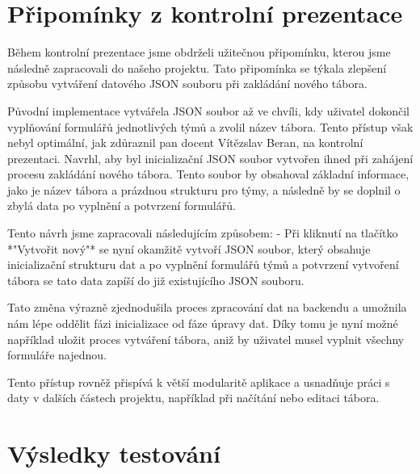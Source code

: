 \documentclass[a4paper, 12pt]{article} %
\begin{document}
\section{Připomínky z kontrolní prezentace}

Během kontrolní prezentace jsme obdrželi užitečnou připomínku, kterou jsme následně 
zapracovali do našeho projektu. Tato připomínka se týkala zlepšení způsobu vytváření datového 
JSON souboru při zakládání nového tábora. 

Původní implementace vytvářela JSON soubor až ve chvíli, kdy uživatel dokončil vyplňování 
formulářů jednotlivých týmů a zvolil název tábora. Tento přístup však nebyl optimální, jak 
zdůraznil pan docent Vítězslav Beran, na kontrolní prezentaci. Navrhl, aby byl 
inicializační JSON soubor vytvořen ihned při zahájení procesu zakládání nového tábora. 
Tento soubor by obsahoval základní informace, jako je název tábora a prázdnou strukturu 
pro týmy, a následně by se doplnil o zbylá data po vyplnění a potvrzení formulářů.

Tento návrh jsme zapracovali následujícím způsobem:
- Při kliknutí na tlačítko *"Vytvořit nový"* se nyní okamžitě vytvoří
JSON soubor, který obsahuje inicializační strukturu dat a po vyplnění formulářů týmů a 
potvrzení vytvoření tábora se tato data zapíší do již existujícího JSON souboru.

Tato změna výrazně zjednodušila proces zpracování dat na backendu a umožnila nám lépe oddělit fázi inicializace od fáze úpravy dat. Díky tomu je nyní možné například uložit proces vytváření tábora, aniž by uživatel musel vyplnit všechny formuláře najednou.

Tento přístup rovněž přispívá k větší modularitě aplikace a usnadňuje práci s daty v dalších částech projektu, například při načítání nebo editaci tábora.


\section{Výsledky testování}
\end{document}
